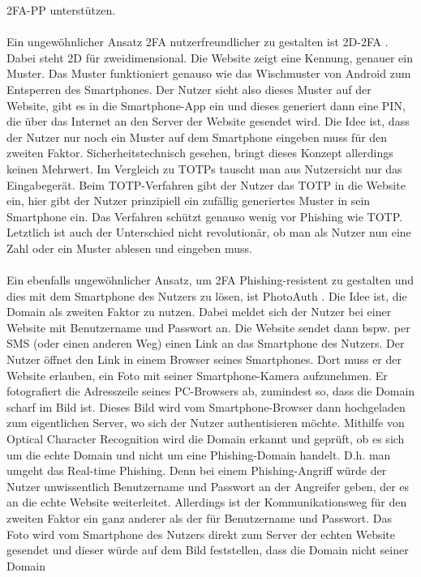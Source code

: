 2FA-PP unterstützen.
\\\\
Ein ungewöhnlicher Ansatz 2FA nutzerfreundlicher zu gestalten ist 2D-2FA \autocite{2D2FA}. Dabei 
steht 2D für zweidimensional. Die Website zeigt eine Kennung, genauer ein Muster. Das Muster 
funktioniert genauso wie das Wischmuster von Android zum Entsperren des Smartphones. Der Nutzer 
sieht also dieses Muster auf der Website, gibt es in die Smartphone-App ein und dieses generiert 
dann eine PIN, die über das Internet an den Server der Website gesendet wird. Die Idee ist, dass 
der Nutzer nur noch ein Muster auf dem Smartphone eingeben muss für den zweiten Faktor. 
Sicherheitstechnisch gesehen, bringt dieses Konzept allerdings keinen Mehrwert. Im Vergleich zu 
TOTPs tauscht man aus Nutzersicht nur das Eingabegerät. Beim TOTP-Verfahren gibt der Nutzer das 
TOTP in die Website ein, hier gibt der Nutzer prinzipiell ein zufällig generiertes Muster in sein 
Smartphone ein. Das Verfahren schützt genauso wenig vor Phishing wie TOTP. Letztlich ist auch der 
Unterschied nicht revolutionär, ob man als Nutzer nun eine Zahl oder ein Muster ablesen und 
eingeben muss.
\\\\
Ein ebenfalls ungewöhnlicher Ansatz, um 2FA Phishing-resistent zu gestalten und dies mit dem 
Smartphone des Nutzers zu lösen, ist PhotoAuth \autocite{PhotoAuth}. Die Idee ist, die Domain als 
zweiten Faktor zu nutzen. Dabei meldet sich der Nutzer bei einer Website mit Benutzername und 
Passwort an. Die Website sendet dann bspw. per SMS (oder einen anderen Weg) einen Link an das 
Smartphone des Nutzers. Der Nutzer öffnet den Link in einem Browser seines Smartphones. Dort muss 
er der Website erlauben, ein Foto mit seiner Smartphone-Kamera aufzunehmen. Er fotografiert die 
Adresszeile seines PC-Browsers ab, zumindest so, dass die Domain scharf im Bild ist. Dieses Bild 
wird vom Smartphone-Browser dann hochgeladen zum eigentlichen Server, wo sich der Nutzer 
authentisieren möchte. Mithilfe von Optical Character Recognition wird die Domain erkannt und 
geprüft, ob es sich um die echte Domain und nicht um eine Phishing-Domain handelt. D.h. man 
umgeht das Real-time Phishing. Denn bei einem Phishing-Angriff würde der Nutzer unwissentlich 
Benutzername und Passwort an der Angreifer geben, der es an die echte Website weiterleitet. 
Allerdings ist der Kommunikationsweg für den zweiten Faktor ein ganz anderer als der für 
Benutzername und Passwort. Das Foto wird vom Smartphone des Nutzers direkt zum Server der echten 
Website gesendet und dieser würde auf dem Bild feststellen, dass die Domain nicht seiner Domain 
